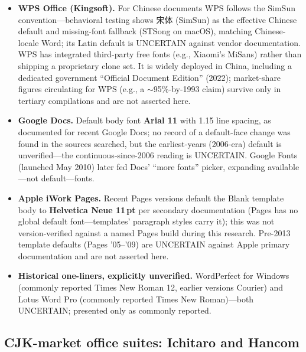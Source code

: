 \documentclass[10pt,a4paper]{article}
\begin{document}
\begin{itemize}[leftmargin=1.2em,itemsep=2pt]
\item \textbf{WPS Office (Kingsoft).} For Chinese documents WPS follows the SimSun
convention---behavioral testing shows 宋体 (SimSun) as the effective Chinese default and
missing-font fallback (STSong on macOS), matching Chinese-locale Word; its Latin default
is UNCERTAIN against vendor documentation. WPS has integrated third-party free fonts
(e.g., Xiaomi's MiSans) rather than shipping a proprietary clone set. It is widely
deployed in China, including a dedicated government ``Official Document Edition'' (2022);
market-share figures circulating for WPS (e.g., a $\sim$95\%-by-1993 claim) survive only
in tertiary compilations and are not asserted here.\cite{s-wps,s-wps-2}
\item \textbf{Google Docs.} Default body font \textbf{Arial 11} with 1.15 line spacing,
as documented for recent Google Docs; no record of a default-face change was found in
the sources searched, but the earliest-years (2006-era) default is unverified---the
continuous-since-2006 reading is UNCERTAIN. Google Fonts (launched May 2010) later fed
Docs' ``more fonts'' picker, expanding available---not default---fonts.\cite{s-gdocs,s-gdocs-2}
\item \textbf{Apple iWork Pages.} Recent Pages versions default the Blank template body
to \textbf{Helvetica Neue 11\,pt} per secondary documentation (Pages has no global
default font---templates' paragraph styles carry it); this was not version-verified
against a named Pages build during this research. Pre-2013 template defaults (Pages
'05--'09) are UNCERTAIN against Apple primary documentation and are not asserted
here.\cite{s-pages,s-pages-2}
\item \textbf{Historical one-liners, explicitly unverified.} WordPerfect for Windows
(commonly reported Times New Roman 12, earlier versions Courier) and Lotus Word Pro
(commonly reported Times New Roman)---both UNCERTAIN; presented only as commonly
reported.\cite{s-legacy}
\end{itemize}

\subsection{CJK-market office suites: Ichitaro and Hancom}\label{sec:cjkoffice}
\end{document}

